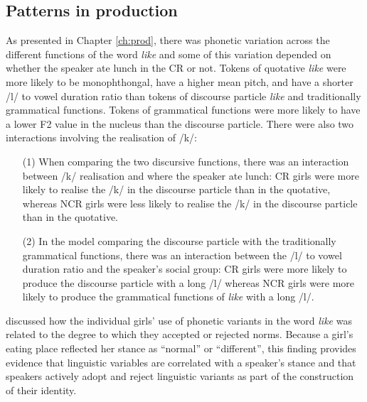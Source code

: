  \subsection{Patterns in production}
 

As presented in Chapter \ref{ch:prod}, there was phonetic variation across the different functions of the word \textit{like} and some of this variation depended on whether the speaker ate lunch in the CR or not.  Tokens of quotative \textit{like} were more likely to be monophthongal, have a higher mean pitch, and have a shorter /l/ to vowel duration ratio than tokens of discourse particle \textit{like} and traditionally grammatical functions.  Tokens of grammatical functions were more likely to have a lower F2 value in the nucleus than the discourse particle.  There were also two interactions involving the realisation of /k/: 
\begin{enumerate}
	\item[(1)] When comparing the two discursive functions, there was an interaction between /k/ realisation and where the speaker ate lunch: CR girls were more likely to realise the /k/ in the discourse particle than in the quotative, whereas NCR girls were less likely to realise the /k/ in the discourse particle than in the quotative.  

	\item[(2)] In the model comparing the discourse particle with the traditionally grammatical functions, there was an interaction between the /l/ to vowel duration ratio and the speaker's social group: CR girls were more likely to produce the discourse particle with a long /l/ whereas NCR girls were more likely to produce the grammatical functions of \textit{like} with a long /l/.

\end{enumerate}
  

\noindent {} discussed how the individual girls' use of phonetic variants in the word \textit{like} was related to the degree to which they accepted or rejected norms.  Because a girl's eating place reflected her stance as ``normal'' or ``different'', this finding provides evidence that linguistic variables are correlated with a speaker's stance and that speakers actively adopt and reject linguistic variants as part of the construction of their identity.


